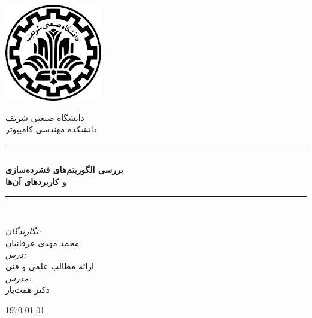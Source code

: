 \newcommand{\HRule}{\rule{\linewidth}{0.1mm}} 
\center %

    \includegraphics[scale=0.5]{figs/sharif.png}%

    \vspace{0.2cm}
    \textsc{ دانشگاه صنعتی شریف}\\[0.2cm] %
    \textsc{ دانشکده مهندسی کامپیوتر}\\[0.2cm]%


\HRule \\[0.4cm]
    { \huge \bfseries بررسی الگوریتم‌های فشرده‌سازی \\و کاربردهای آن‌ها}\\[0.1cm] %
\HRule \\[1.5cm]
 
\begin{minipage}{0.4\textwidth}
\begin{center}

 \large
    
    \emph{نگارندگان:}\\
    محمد مهدی عرفانیان\\
    \vspace{1cm}
    \emph{درس:\\}
    \Large{ارائه مطالب علمی و فنی}\\[1cm]
    \emph{مدرس:\\}
    {دکتر همت‌یار}
    \end{center}
\end{minipage}
\vspace{30mm}

{\large \today}\\[1cm] %
\vfill %